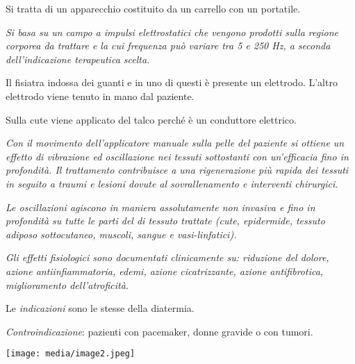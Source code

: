 \documentclass[]{article}
\begin{document}
Si tratta di un apparecchio costituito da un carrello con un portatile.

\emph{Si basa su un campo a impulsi elettrostatici che vengono prodotti
sulla regione corporea da trattare e la cui frequenza può variare tra 5
e 250 Hz, a seconda dell'indicazione terapeutica scelta.}

Il fisiatra indossa dei guanti e in uno di questi è presente un
elettrodo. L'altro elettrodo viene tenuto in mano dal paziente.

Sulla cute viene applicato del talco perché è un conduttore elettrico.

\emph{Con il movimento dell'applicatore manuale sulla pelle del paziente
si ottiene un effetto di vibrazione ed oscillazione nei tessuti
sottostanti con un'efficacia fino in profondità. Il trattamento
contribuisce a una rigenerazione più rapida dei tessuti in seguito a
traumi e lesioni dovute al sovrallenamento e interventi chirurgici.}

\emph{Le oscillazioni agiscono in maniera assolutamente non invasiva e
fino in profondità su tutte le parti del di tessuto trattate (cute,
epidermide, tessuto adiposo sottocutaneo, muscoli, sangue e
vasi-linfatici).}

\emph{Gli effetti fisiologici sono documentati clinicamente su:
riduzione del dolore, azione antiinfiammatoria, edemi, azione
cicatrizzante, azione antifibrotica, miglioramento dell'atroficità.}

Le \emph{indicazioni} sono le stesse della diatermia.

\emph{Controindicazione}: pazienti con pacemaker, donne gravide o con
tumori.

\texttt{[image: media/image2.jpeg]}
\end{document}

